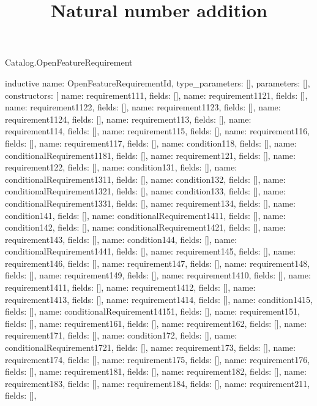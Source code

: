 \begin{lexlean}{Catalog.OpenFeatureRequirement}
\title{Natural number addition}
\begin{semanticmodule}
inductive{
  name: OpenFeatureRequirementId,
  type_parameters: [],
  parameters: [],
  constructors: [
    {name: requirement111, fields: []},
    {name: requirement1121, fields: []},
    {name: requirement1122, fields: []},
    {name: requirement1123, fields: []},
    {name: requirement1124, fields: []},
    {name: requirement113, fields: []},
    {name: requirement114, fields: []},
    {name: requirement115, fields: []},
    {name: requirement116, fields: []},
    {name: requirement117, fields: []},
    {name: condition118, fields: []},
    {name: conditionalRequirement1181, fields: []},
    {name: requirement121, fields: []},
    {name: requirement122, fields: []},
    {name: condition131, fields: []},
    {name: conditionalRequirement1311, fields: []},
    {name: condition132, fields: []},
    {name: conditionalRequirement1321, fields: []},
    {name: condition133, fields: []},
    {name: conditionalRequirement1331, fields: []},
    {name: requirement134, fields: []},
    {name: condition141, fields: []},
    {name: conditionalRequirement1411, fields: []},
    {name: condition142, fields: []},
    {name: conditionalRequirement1421, fields: []},
    {name: requirement143, fields: []},
    {name: condition144, fields: []},
    {name: conditionalRequirement1441, fields: []},
    {name: requirement145, fields: []},
    {name: requirement146, fields: []},
    {name: requirement147, fields: []},
    {name: requirement148, fields: []},
    {name: requirement149, fields: []},
    {name: requirement1410, fields: []},
    {name: requirement1411, fields: []},
    {name: requirement1412, fields: []},
    {name: requirement1413, fields: []},
    {name: requirement1414, fields: []},
    {name: condition1415, fields: []},
    {name: conditionalRequirement14151, fields: []},
    {name: requirement151, fields: []},
    {name: requirement161, fields: []},
    {name: requirement162, fields: []},
    {name: requirement171, fields: []},
    {name: condition172, fields: []},
    {name: conditionalRequirement1721, fields: []},
    {name: requirement173, fields: []},
    {name: requirement174, fields: []},
    {name: requirement175, fields: []},
    {name: requirement176, fields: []},
    {name: requirement181, fields: []},
    {name: requirement182, fields: []},
    {name: requirement183, fields: []},
    {name: requirement184, fields: []},
    {name: requirement211, fields: []},
}
\end{semanticmodule}
\end{lexlean}
